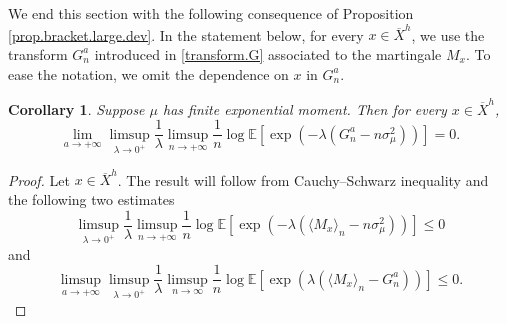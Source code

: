 \documentclass[10pt]{amsart}
\theoremstyle{plain}
\newtheorem{corollary}[theorem]{Corollary}
\theoremstyle{definition}
\newcommand\E{\mathbb{E}}
\begin{document}
We end this section with the following consequence of Proposition \ref{prop.bracket.large.dev}.
In the statement below, for every $x\in \overline{X}^h$, we use the transform $G_n^a$ introduced in \eqref{transform.G} associated to the martingale $M_x$. To ease the notation, we omit the dependence on $x$ in $G_n^a$.

\begin{corollary}\label{corollary.laplace.bracket}
Suppose $\mu$ has finite exponential moment. Then for every $x\in \overline{X}^h$,
\[
\lim_{a\to +\infty}\limsup_{\lambda\to 0^+}\frac{1}{\lambda} \limsup_{n\to +\infty}\frac{1}{n}\log {\E[\exp(-\lambda (G_n^a - n \sigma_{\mu}^2))]}= 0.
\]
\end{corollary}

\begin{proof}
Let $x\in \overline{X}^h$. The result will follow from Cauchy--Schwarz inequality and the following two estimates
\begin{equation}\label{1bis}
\limsup_{\lambda\to 0^+}\frac{1}{\lambda} \limsup_{n\to +\infty}\frac{1}{n}\log {\E[\exp(-\lambda (\langle M_x\rangle_n-n\sigma_{\mu}^2))]}\leq 0
\end{equation}
and
\begin{equation}\label{backtoidd2}
\limsup_{a\to +\infty} \limsup_{\lambda \to 0^+}\frac{1}{\lambda} \limsup_{n\to \infty} \frac{1}{n} \log \E[\exp(\lambda (\langle M_x \rangle_n - G_n^a))]\leq 0.
\end{equation}


\end{proof}
\end{document}
